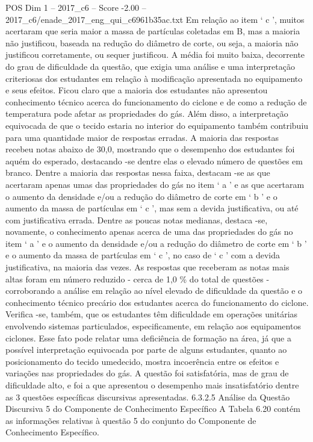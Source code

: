 \begin{textsample}{POS Dim 1 – 2017\_c6 – Score -2.00 – 2017\_c6/enade\_2017\_eng\_qui\_c6961b35ac.txt}
Em relação ao item ‘ c ’, muitos acertaram que seria maior a massa de partículas coletadas em B, mas a maioria não justificou, baseada na redução do diâmetro de corte, ou seja, a maioria não justificou corretamente, ou sequer justificou.
A média foi muito baixa, decorrente do grau de dificuldade da questão, que exigia uma análise e uma interpretação criteriosas dos estudantes em relação à modificação apresentada no equipamento e seus efeitos.
Ficou claro que a maioria dos estudantes não apresentou conhecimento técnico acerca do funcionamento do ciclone e de como a redução de temperatura pode afetar as propriedades do gás.
Além disso, a interpretação equivocada de que o tecido estaria no interior do equipamento também contribuiu para uma quantidade maior de respostas erradas.
A maioria das respostas recebeu notas abaixo de 30,0, mostrando que o desempenho dos estudantes foi aquém do esperado, destacando -se dentre elas o elevado número de questões em branco.
Dentre a maioria das respostas nessa faixa, destacam -se as que acertaram apenas umas das propriedades do gás no item ‘ a ’ e as que acertaram o aumento da densidade e/ou a redução do diâmetro de corte em ‘ b ’ e o aumento da massa de partículas em ‘ c ’, mas sem a devida justificativa, ou até com justificativa errada.
Dentre as poucas notas medianas, destaca -se, novamente, o conhecimento apenas acerca de uma das propriedades do gás no item ‘ a ’ e o aumento da densidade e/ou a redução do diâmetro de corte em ‘ b ’ e o aumento da massa de partículas em ‘ c ’, no caso de ‘ c ’ com a devida justificativa, na maioria das vezes.
As respostas que receberam as notas mais altas foram em número reduzido - cerca de 1,0 \% do total de questões - corroborando a análise em relação ao nível elevado de dificuldade da questão e o conhecimento técnico precário dos estudantes acerca do funcionamento do ciclone.
Verifica -se, também, que os estudantes têm dificuldade em operações unitárias envolvendo sistemas particulados, especificamente, em relação aos equipamentos ciclones.
Esse fato pode relatar uma deficiência de formação na área, já que a possível interpretação equivocada por parte de alguns estudantes, quanto ao posicionamento do tecido umedecido, mostra incoerência entre os efeitos e variações nas propriedades do gás.
A questão foi satisfatória, mas de grau de dificuldade alto, e foi a que apresentou o desempenho mais insatisfatório dentre as 3 questões específicas discursivas apresentadas. 6.3.2.5 Análise da Questão Discursiva 5 do Componente de Conhecimento Específico A Tabela 6.20 contém as informações relativas à questão 5 do conjunto do Componente de Conhecimento Específico.

\end{textsample}
